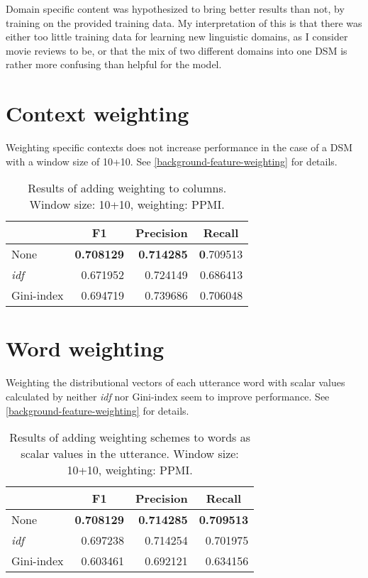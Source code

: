 Domain specific content was hypothesized to bring better results than not, by training on the provided training data. My interpretation of this is that there was either too little training data for learning new linguistic domains, as I consider movie reviews to be, or that the mix of two different domains into one DSM is rather more confusing than helpful for the model.


\section{Context weighting}\label{weighting-columns-and-rows-in-the-word-space}

Weighting specific contexts does not increase performance in the case of a DSM with a window size of 10+10. See \cref{background-feature-weighting} for details.

\begin{table}[H]
\centering
\begin{tabular}{lrrr}
\toprule
  & \multicolumn{1}{c}{F1} & \multicolumn{1}{c}{Precision}
 & \multicolumn{1}{c}{Recall} \\
 \midrule
None            & \textbf{0.708129} & \textbf{0.714285} & \textbf{0}.709513 \\
\emph{idf}             & 0.671952          & 0.724149          & 0.686413          \\
Gini-index      & 0.694719          & 0.739686          & 0.706048          \\
\hline
\end{tabular}
    \caption{Results of adding weighting to columns. Window size: 10+10, weighting: PPMI.}
    \label{tbl:results-weighting-features}
\end{table}


\section{Word weighting}\label{results-weighting-words}

Weighting the distributional vectors of each utterance word with scalar values calculated by neither \emph{idf} nor Gini-index seem to improve performance. See \cref{background-feature-weighting} for details.

\begin{table}[H]
\centering
\begin{tabular}{lrrr}
\toprule
 & \multicolumn{1}{c}{F1} & \multicolumn{1}{c}{Precision}
 & \multicolumn{1}{c}{Recall} \\
 \midrule
None            & \textbf{0.708129} & \textbf{0.714285} & \textbf{0.709513} \\
\emph{idf}             & 0.697238          & 0.714254          & 0.701975          \\
Gini-index      & 0.603461          & 0.692121          & 0.634156          \\
\hline
\end{tabular}
    \caption{Results of adding weighting schemes to words as scalar values in the utterance. Window size: 10+10, weighting: PPMI.}
    \label{tbl:results-weighting-words}
\end{table}


